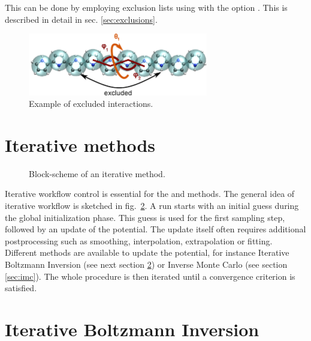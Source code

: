 This can be done by employing exclusion lists using  with the option . This is described in detail in sec. \ref{sec:exclusions}.
\begin{figure}[h]
  \centering
  \includegraphics[width=0.7\textwidth]{fig/excl}
  \caption{\label{fig:excl}Example of excluded interactions.}
\end{figure}


\newpage
\section{Iterative methods}
\label{sec:theory_iterative_methods}

\begin{figure}  
  \caption{
    \label{fig:iterative_methods}
    Block-scheme of an iterative method.
  }
\end{figure}
Iterative workflow control is essential for the \ibi and \imc methods. The general idea of iterative workflow is sketched in fig.~\ref{fig:iterative_methods}. A run starts with an initial guess during the global initialization phase. This guess is used for the first sampling step, followed by an update of the potential. The update itself often requires additional postprocessing such as smoothing, interpolation, extrapolation or fitting. Different methods are available to update the potential, for instance Iterative Boltzmann Inversion (see next section \ref{sec:ibi}) or Inverse Monte Carlo (see section \ref{sec:imc}). The whole procedure is then iterated until a convergence criterion is satisfied.


\section{Iterative Boltzmann Inversion}
\label{sec:ibi}

